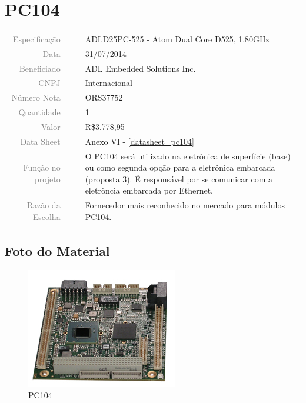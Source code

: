 \section{PC104}
\label{pc104}


\begin{table}[ht!]

	\begin{tabular}{r l|l p{12cm} }
		
		\textcolor{gray}{Especificação} &&& 	{ADLD25PC-525 - Atom Dual Core D525,
		1.80GHz}\\
		\textcolor{gray}{Data} &&& 				{31/07/2014}\\
        \textcolor{gray}{Beneficiado} &&&		{ADL Embedded Solutions Inc.} \\
        \textcolor{gray}{CNPJ} &&& 				{Internacional} \\
        \textcolor{gray}{Número Nota} &&& 		{ORS37752} \\
		\textcolor{gray}{Quantidade} &&& 		{1} \\
		\textcolor{gray}{Valor} &&& 			{R\$3.778,95} \\
		\textcolor{gray}{Data Sheet} &&& 		{Anexo VI - \ref{datasheet_pc104}} \\

		\textcolor{gray}{Função no projeto} &&& {O PC104 será utilizado na eletrônica
		de superfície (base) ou como segunda opção para a eletrônica embarcada
		(proposta 3). É responsável por se comunicar com a eletrôncia embarcada por
		Ethernet.}
		\\
		\textcolor{gray}{Razão da Escolha} &&& {Fornecedor mais reconhecido no
		mercado para módulos PC104.}
	\end{tabular}
\end{table}

\newpage

\subsection{Foto do Material}
\begin{figure}[H]
 \centering
 \includegraphics[width=1\columnwidth]{PC104/foto.jpg}
 \caption{PC104}
\end{figure} 


